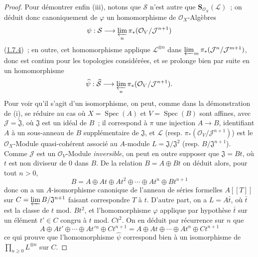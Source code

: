\begin{proof}
Pour démontrer enfin (iii), notons que $\mathcal{S}$ n'est autre que
$\mathbf{S}_{\mathcal{O}_X}(\mathcal{L})$~; on déduit donc canoniquement de
$\varphi$ un homomorphisme de $\mathcal{O}_X$-Algèbres
\[
  \psi:\mathcal{S}\longrightarrow
  \varprojlim_n\pi_*(\mathcal{O}_V/\mathcal{J}^{n+1})
\]
(\hyperref[II.1.7.4-fr]{1.7.4})~; en outre, cet homomorphisme applique
$\mathcal{L}^{\otimes n}$ dans
$\varprojlim_m\pi_*(\mathcal{J}^n/\mathcal{J}^{m+1})$, donc est continu pour
les topologies considérées, et se prolonge bien par suite en un homomorphisme
\[
  \widehat{\psi}:\widehat{\mathcal{S}}\longrightarrow
  \varprojlim_n\pi_*(\mathcal{O}_V/\mathcal{J}^{n+1}).
\]
Pour voir qu'il s'agit d'un isomorphisme, on peut, comme dans la démonstration
de (i), se réduire au cas où $X=\operatorname{Spec}(A)$ et
$V=\operatorname{Spec}(B)$ sont affines, avec
$\mathcal{J}=\widetilde{\mathfrak{J}}$, où $\mathfrak{J}$ est un idéal de
$B$~; il correspond à $\pi$ une injection $A\to B$, identifiant $A$ à un
sous-anneau de $B$ supplémentaire de $\mathfrak{J}$, et $\mathcal{L}$ (resp.
$\pi_*(\mathcal{O}_V/\mathcal{J}^{n+1})$) est le $\mathcal{O}_X$-Module
quasi-cohérent associé au $A$-module $L=\mathfrak{J}/\mathfrak{J}^2$ (resp.
$B/\mathfrak{J}^{n+1}$). Comme $\mathcal{J}$ est un
$\mathcal{O}_V$-Module \emph{inversible}, on peut en outre supposer que
$\mathfrak{J}=Bt$, où $t$ est non diviseur de 0 dans $B$. De la relation
$B=A\oplus Bt$ on déduit alors, pour tout $n>0$,
\[
  B=A\oplus At\oplus At^2\oplus\cdots\oplus At^n\oplus Bt^{n+1}
\]
donc on a un $A$-isomorphisme canonique de l'anneau de séries formelles
$A[[T]]$ sur $C=\varprojlim B/\mathfrak{J}^{n+1}$ faisant correspondre $T$ à
$t$. D'autre part, on a $L=A\bar t$, où $\bar t$ est la classe de $t$
mod. $Bt^2$, et l'homomorphisme $\varphi$ applique par hypothèse $\bar t$ sur
un élément $t'\in C$ congru à $t$ mod. $Ct^2$. On en déduit par récurrence
sur $n$ que
\[
  A\oplus At'\oplus\cdots\oplus At'{}^n\oplus Ct^{n+1}
  =A\oplus At\oplus\cdots\oplus At^n\oplus Ct^{n+1}
\]
ce qui prouve que l'homomorphisme $\widehat{\psi}$ correspond bien à un
isomorphisme de $\prod_{n\geqslant0}L^{\otimes n}$ sur $C$.
\end{proof}

